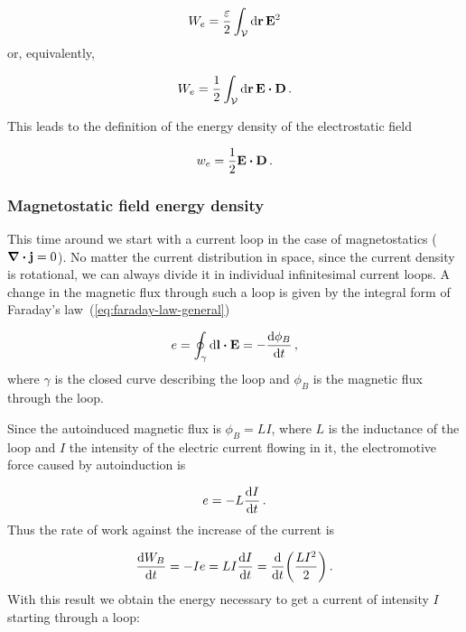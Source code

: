 \documentclass[12pt, class=report, crop=false]{standalone}
\begin{document}
\begin{equation}
  W_{e} = \frac{\varepsilon}{2} \int_\mathcal{V} \dd{\vb{r}} \vb{E}^{2}
\end{equation}
or, equivalently,

\begin{equation}
  W_{e} = \frac{1}{2} \int_\mathcal{V} \dd{\vb{r}} \vb{E} \vdot \vb{D} \,.
\end{equation}

\par
This leads to the definition of the energy density of the electrostatic field

\begin{equation}
  \label{def:electrostatic-en-density}
  w_{e} = \frac{1}{2} \vb{E} \vdot \vb{D} \,.
\end{equation}

\subsubsection{Magnetostatic field energy density}

This time around we start with a current loop in the case of magnetostatics (\(\div{\vb{j}}=0\)). No matter the current distribution in space, since the current density is rotational, we can always divide it in individual infinitesimal current loops. A change in the magnetic flux through such a loop is given by the integral form of Faraday's law~(\ref{eq:faraday-law-general})

\begin{equation}
  e = \oint_{\gamma} \dd{\vb{l}}\vdot\vb{E} = - \dv{\phi_{B}}{t} \,,
\end{equation}
where \(\gamma\) is the closed curve describing the loop and \(\phi_{B}\) is the magnetic flux through the loop.

\par
Since the autoinduced magnetic flux is \(\phi_{B}=LI\), where \(L\) is the inductance of the loop and \(I\) the intensity of the electric current flowing in it, the electromotive force caused by autoinduction is

\begin{equation*}
  e = -L \dv{I}{t} \,.
\end{equation*}
Thus the rate of work against the increase of the current is

\begin{equation*}
  \dv{W_{B}}{t} = - I e = LI \dv{I}{t} = \dv{t} (\frac{LI^{2}}{2})\,.
\end{equation*}
With this result we obtain the energy necessary to get a current of intensity \(I\) starting through a loop:
\end{document}
